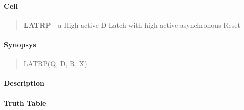 \label{LATRP}
\paragraph{Cell}
\begin{quote}
    \textbf{LATRP} - a High-active D-Latch with high-active asynchronous Reset
\end{quote}

\paragraph{Synopsys}
\begin{quote}
    LATRP(Q, D, R, X)
\end{quote}

\paragraph{Description}

%

\paragraph{Truth Table}
%

